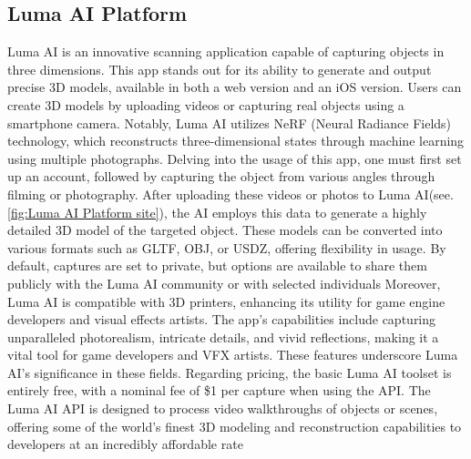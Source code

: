 \subsection{Luma AI Platform}
\label{sec:Luma AI Platform}
\singlespacing
Luma AI\cite{lumaai} is an innovative scanning application capable of capturing objects in three dimensions. This app stands out for its ability to generate and output precise 3D models, available in both a web version and an iOS version. Users can create 3D models by uploading videos or capturing real objects using a smartphone camera. Notably, Luma AI utilizes NeRF (Neural Radiance Fields) technology, which reconstructs three-dimensional states through machine learning using multiple photographs.
\singlespacing
Delving into the usage of this app, one must first set up an account, followed by capturing the object from various angles through filming or photography. After uploading these videos or photos to Luma AI(see.\ref{fig:Luma AI Platform site}), the AI employs this data to generate a highly detailed 3D model of the targeted object. These models can be converted into various formats such as GLTF, OBJ, or USDZ, offering flexibility in usage. By default, captures are set to private, but options are available to share them publicly with the Luma AI community or with selected individuals
\singlespacing
Moreover, Luma AI is compatible with 3D printers, enhancing its utility for game engine developers and visual effects artists. The app's capabilities include capturing unparalleled photorealism, intricate details, and vivid reflections, making it a vital tool for game developers and VFX artists. These features underscore Luma AI's significance in these fields.
\singlespacing
Regarding pricing, the basic Luma AI toolset is entirely free, with a nominal fee of \$1 per capture when using the API. The Luma AI API is designed to process video walkthroughs of objects or scenes, offering some of the world's finest 3D modeling and reconstruction capabilities to developers at an incredibly affordable rate


